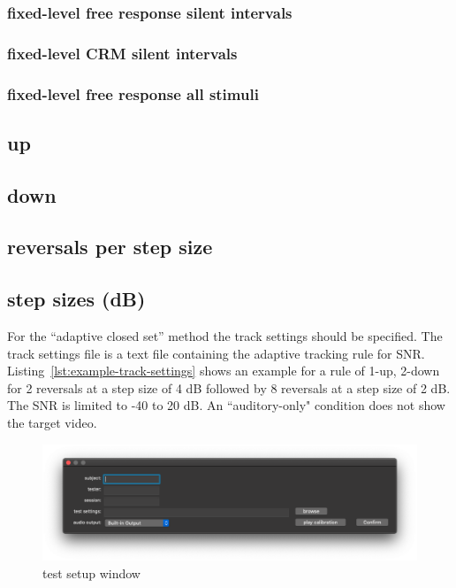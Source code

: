 \documentclass[11pt,pdftex,letterpaper]{article}
\begin{document}
\subsubsection{fixed-level free response silent intervals}
\subsubsection{fixed-level CRM silent intervals}
\subsubsection{fixed-level free response all stimuli}
\subsection{up}
\subsection{down}
\subsection{reversals per step size}
\subsection{step sizes (dB)}
For the ``adaptive closed set'' method the track settings should be specified. The track settings file is a text file containing the adaptive tracking rule for SNR. Listing~\ref{lst:example-track-settings} shows an example for a rule of 1-up, 2-down for 2 reversals at a step size of 4 dB followed by 8 reversals at a step size of 2 dB. The SNR is limited to -40 to 20 dB. An ``auditory-only" condition does not show the target video.

\begin{figure}
\centering
\includegraphics[width = 0.9\linewidth]{test-setup-window.png}
\caption{test setup window}
\label{fig:test-setup-window}
\end{figure}

\noindent\begin{minipage}{\textwidth}

\end{minipage}
\end{document}
